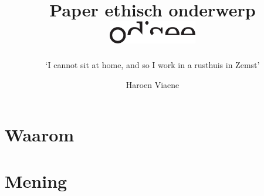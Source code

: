 \documentclass[12pt, a4paper]{paper}
\title{
\vspace{-2cm}
Paper ethisch onderwerp\\
\vspace{-1cm}
\hfill\includegraphics[height=1cm]{logo.pdf}}
\subtitle{`I cannot sit at home, and so I work in a rusthuis in Zemst'
\vspace{-.5cm}}
\author{
\vspace{-1cm}
Haroen Viaene}
\begin{document}
\maketitle

\begin{abstract}

\Blindtext[2]

\end{abstract}

\section{Waarom}

\Blindtext[3]

\section{Mening}

\Blindtext[3]
\end{document}
